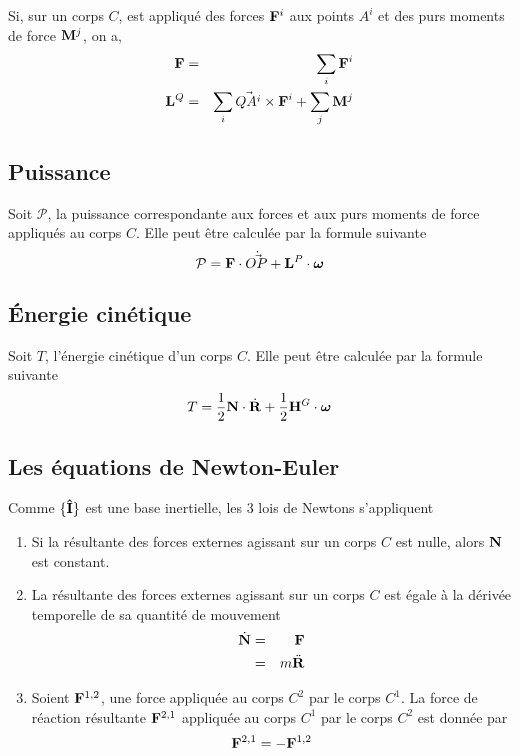 \documentclass[11pt,a4paper]{article}
\newcommand\fvd[1]{\dot{\bf #1}} %
\newcommand\fvdd[1]{\ddot{\bf #1}} %
\newcommand\ui{{\bf\hat{I}}} %
\newcommand\omegaf{{\bm \omega}}
\newcommand\st{{\bf L}}
\newcommand\pst{{\bf M}}
\newcommand\lm{{\bf N}}
\newcommand\am{{\bf H}}
\newcommand\fo{{\bf F}}
\newcommand\xgd{\ensuremath{\fvd{R}}}
\newcommand\xgdd{\ensuremath{\fvdd{R}}}
\newcommand\dvec[1]{\dot{\vec{ #1}}}
\begin{document}
Si, sur un corps $C$, est appliqué des forces $\fo^i$ aux points $A^i$ et des purs moments de force $\pst^j$, on a,
\begin{eqnarray*}
	\fo &=& \sum_i \fo^i\\
	\st^Q &=&  \sum_i \vec{QA^i}\times\fo^i + \sum_j \pst^j
\end{eqnarray*}

\subsection{Puissance}
Soit $\mathcal{P}$, la puissance correspondante aux forces et aux purs moments de force appliqués au corps $C$.
Elle peut être calculée par la formule suivante
\[ \mathcal{P} = \fo\cdot\dvec{OP} + \st^P\cdot\omegaf \]

\subsection{\'Energie cinétique}
Soit $T$, l'énergie cinétique d'un corps $C$.
Elle peut être calculée par la formule suivante
\[ T = \frac{1}{2} \lm \cdot \xgd + \frac{1}{2} \am^G \cdot \omegaf \]

\subsection{Les équations de Newton-Euler}
Comme $\{\ui\}$ est une base inertielle, les 3 lois de Newtons s'appliquent
\begin{enumerate}
	\item Si la résultante des forces externes agissant sur un corps $C$ est nulle, alors $\lm$ est constant.
	\item La résultante des forces externes agissant sur un corps $C$ est égale à la dérivée temporelle de sa quantité de mouvement
		\begin{eqnarray*}
			\dot{\lm} &=& \fo\\
			&=& m \xgdd
		\end{eqnarray*}
	\item Soient $\fo^{1,2}$, une force appliquée au corps $C^2$ par le corps $C^1$.
		La force de réaction résultante $\fo^{2,1}$ appliquée au corps $C^1$ par le corps $C^2$ est donnée par
		\[ \fo^{2,1} = -\fo^{1,2} \]
\end{enumerate}
\end{document}
